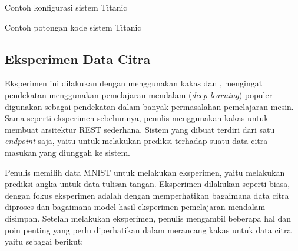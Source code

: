\begin{code}
	\caption{Contoh konfigurasi sistem Titanic}\label{listing:14}
\end{code}

\begin{code}
	\caption{Contoh potongan kode sistem Titanic}\label{listing:15}
\end{code}

\subsection{Eksperimen Data Citra}\label{section:03-image-experiment}

Eksperimen ini dilakukan dengan menggunakan kakas  dan , mengingat pendekatan menggunakan pemelajaran mendalam (\textit{deep learning}) populer digunakan sebagai pendekatan dalam banyak permasalahan pemelajaran mesin.
Sama seperti eksperimen sebelumnya, penulis menggunakan kakas  untuk membuat arsitektur REST sederhana.
Sistem yang dibuat terdiri dari satu \textit{endpoint} saja, yaitu untuk melakukan prediksi terhadap suatu data citra masukan yang diunggah ke sistem.

Penulis memilih data MNIST untuk melakukan eksperimen, yaitu melakukan prediksi angka untuk data tulisan tangan.
Eksperimen dilakukan seperti biasa, dengan fokus eksperimen adalah dengan memperhatikan bagaimana data citra diproses dan bagaimana model hasil eksperimen pemelajaran mendalam disimpan.
Setelah melakukan eksperimen, penulis mengambil beberapa hal dan poin penting yang perlu diperhatikan dalam merancang kakas untuk data citra yaitu sebagai berikut:

